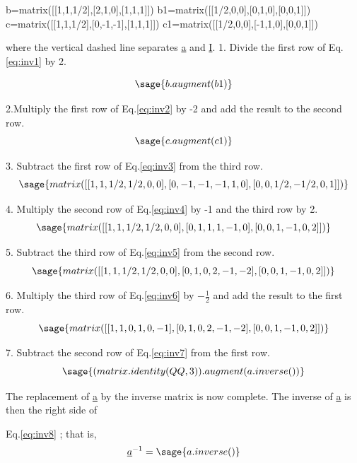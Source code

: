 \documentclass[12pt]{report}
\newcommand{\eref}[1]{
	Eq.\ref{#1}
}
\begin{document}
\begin{sagesilent}
	b=matrix([[1,1,1/2],[2,1,0],[1,1,1]])
	b1=matrix([[1/2,0,0],[0,1,0],[0,0,1]])
	c=matrix([[1,1,1/2],[0,-1,-1],[1,1,1]])
	c1=matrix([[1/2,0,0],[-1,1,0],[0,0,1]])
\end{sagesilent}

where the vertical dashed line separates \underline{a} and \underline{I}.
1. Divide the first row of \eref{eq:inv1} by 2.

\begin{equation}
	\sage{b.augment(b1)}
	\label{eq:inv2}
\end{equation}

2.Multiply the first row of \eref{eq:inv2} by -2 and add the result to
the second row.
\begin{equation}
	\sage{c.augment(c1)}
	\label{eq:inv3}
\end{equation}

3. Subtract the first row of \eref{eq:inv3} from the third row.
\begin{equation}
	\sage{matrix([[1,1,1/2,1/2,0,0],[0,-1,-1,-1,1,0],[0,0,1/2,-1/2,0,1]])}
	\label{eq:inv4}
\end{equation}

4. Multiply the second row of \eref{eq:inv4} by -1 and the third row by 2.
\begin{equation}
	\sage{matrix([[1,1,1/2,1/2,0,0],[0,1,1,1,-1,0],[0,0,1,-1,0,2]])}
	\label{eq:inv5}
\end{equation}

5. Subtract the third row of \eref{eq:inv5} from the second row.
\begin{equation}
	\sage{matrix([[1,1,1/2,1/2,0,0],[0,1,0,2,-1,-2],[0,0,1,-1,0,2]])}
	\label{eq:inv6}
\end{equation}

6. Multiply the third row of \eref{eq:inv6} by $-\frac{1}{2}$ and add the
result to the first row.
\begin{equation}
	\sage{matrix([[1,1,0,1,0,-1],[0,1,0,2,-1,-2],[0,0,1,-1,0,2]])}
	\label{eq:inv7}
\end{equation}

7. Subtract the second row of \eref{eq:inv7} from the first row.
\begin{equation} 
	\sage{(matrix.identity(QQ,3)).augment(a.inverse())}
	\label{eq:inv8}
\end{equation}

The replacement of \underline{a} by the inverse matrix is now
complete. The inverse of \underline{a} is then the right side of
\eref{eq:inv8}; that is,
\begin{equation}
	\underline{a}^{-1} = \sage{a.inverse()}
\end{equation}
\end{document}
